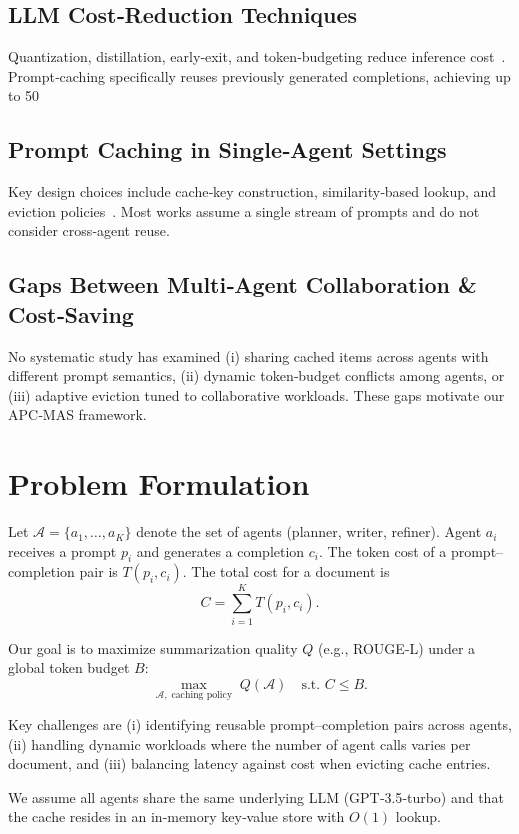 \documentclass[conference]{IEEEtran}
\begin{document}
\subsection{LLM Cost‑Reduction Techniques}
Quantization, distillation, early‑exit, and token‑budgeting reduce inference cost~\cite{wu2023quant, li2023early}.  Prompt‑caching specifically reuses previously generated completions, achieving up to 50 %

\subsection{Prompt Caching in Single‑Agent Settings}
Key design choices include cache‑key construction, similarity‑based lookup, and eviction policies~\cite{zhang2022cachegpt, sun2023promptreuse}.  Most works assume a single stream of prompts and do not consider cross‑agent reuse.

\subsection{Gaps Between Multi‑Agent Collaboration \& Cost‑Saving}
No systematic study has examined (i) sharing cached items across agents with different prompt semantics, (ii) dynamic token‑budget conflicts among agents, or (iii) adaptive eviction tuned to collaborative workloads.  These gaps motivate our APC‑MAS framework.

\section{Problem Formulation}\label{sec:problem}
Let $\mathcal{A}=\{a_1,\dots,a_K\}$ denote the set of agents (planner, writer, refiner).  Agent $a_i$ receives a prompt $p_i$ and generates a completion $c_i$.  The token cost of a prompt–completion pair is $T(p_i,c_i)$.  The total cost for a document is
\[
C = \sum_{i=1}^{K} T(p_i,c_i).
\]

Our goal is to maximize summarization quality $Q$ (e.g., ROUGE‑L) under a global token budget $B$:
\[
\max_{\mathcal{A},\;\text{caching policy}} \; Q(\mathcal{A}) \quad \text{s.t. } C \le B.
\]

Key challenges are (i) identifying reusable prompt–completion pairs across agents, (ii) handling dynamic workloads where the number of agent calls varies per document, and (iii) balancing latency against cost when evicting cache entries.

We assume all agents share the same underlying LLM (GPT‑3.5‑turbo) and that the cache resides in an in‑memory key‑value store with $O(1)$ lookup.
\end{document}
